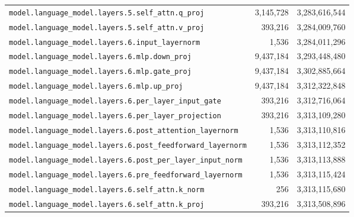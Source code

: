 \documentclass[10pt,a4paper]{article}
\theoremstyle{definition}
\begin{document}
\begin{appendices}
\begin{longtable}{p{9.5cm}rr}
\texttt{model.\allowbreak{}language\_model.\allowbreak{}layers.\allowbreak{}5.\allowbreak{}self\_attn.\allowbreak{}q\_proj} & 3,145,728 & 3,283,616,544 \\
\texttt{model.\allowbreak{}language\_model.\allowbreak{}layers.\allowbreak{}5.\allowbreak{}self\_attn.\allowbreak{}v\_proj} & 393,216 & 3,284,009,760 \\
\texttt{model.\allowbreak{}language\_model.\allowbreak{}layers.\allowbreak{}6.\allowbreak{}input\_layernorm} & 1,536 & 3,284,011,296 \\
\texttt{model.\allowbreak{}language\_model.\allowbreak{}layers.\allowbreak{}6.\allowbreak{}mlp.\allowbreak{}down\_proj} & 9,437,184 & 3,293,448,480 \\
\texttt{model.\allowbreak{}language\_model.\allowbreak{}layers.\allowbreak{}6.\allowbreak{}mlp.\allowbreak{}gate\_proj} & 9,437,184 & 3,302,885,664 \\
\texttt{model.\allowbreak{}language\_model.\allowbreak{}layers.\allowbreak{}6.\allowbreak{}mlp.\allowbreak{}up\_proj} & 9,437,184 & 3,312,322,848 \\
\texttt{model.\allowbreak{}language\_model.\allowbreak{}layers.\allowbreak{}6.\allowbreak{}per\_layer\_input\_gate} & 393,216 & 3,312,716,064 \\
\texttt{model.\allowbreak{}language\_model.\allowbreak{}layers.\allowbreak{}6.\allowbreak{}per\_layer\_projection} & 393,216 & 3,313,109,280 \\
\texttt{model.\allowbreak{}language\_model.\allowbreak{}layers.\allowbreak{}6.\allowbreak{}post\_attention\_layernorm} & 1,536 & 3,313,110,816 \\
\texttt{model.\allowbreak{}language\_model.\allowbreak{}layers.\allowbreak{}6.\allowbreak{}post\_feedforward\_layernorm} & 1,536 & 3,313,112,352 \\
\texttt{model.\allowbreak{}language\_model.\allowbreak{}layers.\allowbreak{}6.\allowbreak{}post\_per\_layer\_input\_norm} & 1,536 & 3,313,113,888 \\
\texttt{model.\allowbreak{}language\_model.\allowbreak{}layers.\allowbreak{}6.\allowbreak{}pre\_feedforward\_layernorm} & 1,536 & 3,313,115,424 \\
\texttt{model.\allowbreak{}language\_model.\allowbreak{}layers.\allowbreak{}6.\allowbreak{}self\_attn.\allowbreak{}k\_norm} & 256 & 3,313,115,680 \\
\texttt{model.\allowbreak{}language\_model.\allowbreak{}layers.\allowbreak{}6.\allowbreak{}self\_attn.\allowbreak{}k\_proj} & 393,216 & 3,313,508,896 \\

\end{longtable}
\end{appendices}
\end{document}
